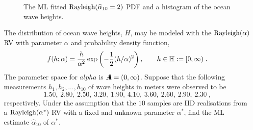 \begin{figure}[htpb]
\caption{The ML fitted ${\rm Rayleigh}(\widehat{\alpha}_{10}= 2)$ PDF and a histogram of the ocean wave heights.\label{F:RayleighOceanHeightsMLE}}
\centering   {}
\end{figure}
\begin{example}\label{LW:RayleighOceanHeightsMLE}
The distribution of ocean wave heights, $H$, may be modeled with the ${\rm Rayleigh}(\alpha)$ RV with parameter $\alpha$ and probability density function,
\[
f(h;\alpha) = \frac{h}{\alpha^2} \exp \left({-\frac{1}{2} (h/\alpha)^2}\right), \qquad h \in \mathbb{H} := [0,\infty) \ .
\]
The parameter space for $alpha$ is ${A}\mspace{-11 mu}{A} = (0,\infty)$.  Suppose that the following measurements $h_1,h_2,\ldots,h_{10}$ of wave heights in meters were observed to be
\[
1.50, \  2.80, \ 2.50, \ 3.20, \ 1.90, \ 4.10, \ 3.60, \ 2.60, \ 2.90, \ 2.30 \ ,
\]
respectively.  Under the assumption that the $10$ samples are IID realisations from a ${\rm Rayleigh}(\alpha^*)$ RV with a fixed and unknown parameter $\alpha^*$, find the ML estimate $\widehat{\alpha}_{10}$ of $\alpha^*$.


\end{example}
